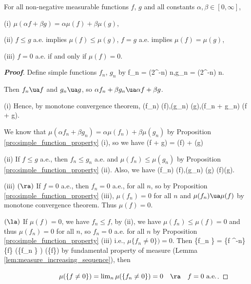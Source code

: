\begin{theorem}\label{thm:non_negative_measurable_property}
For all non-negative measurable functions $f$, $g$ and all constants $\alpha, \beta \in [0,\infty]$,
\ben
\item [(i)] $\mu(\alpha f + \beta g) = \alpha\mu(f) + \beta\mu(g)$,
\item [(ii)] $f \leq g$ a.e. implies $\mu(f) \leq \mu(g)$, $f=g$ a.e. implies $\mu(f) = \mu(g)$,
\item [(iii)] $f = 0$ a.e. if and only if $\mu(f) = 0$.
\een
\end{theorem}
\begin{proof}[\bf Proof]
Define simple functions $f_n$, $g_n$ by
\be
f_n = (2^{-n}) \land n,\quad\quad  g_n = (2^{-n}) \land n.
\ee

Then $f_n \ua f$ and $g_n \ua g$, so $\alpha f_n+\beta g_n \ua \alpha f +\beta g$.
\ben
\item [(i)] Hence, by monotone convergence theorem,
\be
\mu(f_n) \ua \mu(f),\quad \mu(g_n) \ua \mu(g),\quad \mu(\alpha f_n + \beta g_n) \ua \mu(\alpha f + \beta g).
\ee

We know that $\mu(\alpha f_n + \beta g_n) = \alpha\mu(f_n) + \beta\mu(g_n)$ by Proposition \ref{pro:simple_function_property} (i), so we have
\be
\mu(\alpha f + \beta g) = \alpha\mu(f) + \beta\mu(g)
\ee
\item [(ii)] If $f\leq g$ a.e., then $f_n \leq g_n$ a.e. and $\mu(f_n) \leq \mu(g_n)$ by Proposition \ref{pro:simple_function_property} (ii). Also, we have
\be
\mu(f_n) \ua \mu(f),\quad \mu(g_n) \ua \mu(g) \quad\ra\quad \mu(f)\leq \mu(g).
\ee

\item [(iii)] $(\ra)$ If $f = 0$ a.e., then $f_n = 0$ a.e., for all $n$, so by Proposition \ref{pro:simple_function_property} (iii), $\mu(f_n) = 0$ for all $n$ and $\mu(f_n)\ua \mu(f)$ by monotone convergence theorem. Thus $\mu(f) = 0$.

$(\la)$ If $\mu(f) = 0$, we have $f_n \leq f$, by (ii), we have $\mu(f_n) \leq \mu(f) = 0$ and thus $\mu(f_n) = 0$ for all $n$, so $f_n = 0$ a.e. for all $n$ by Proposition \ref{pro:simple_function_property} (iii) i.e., $\mu\{f_n \neq 0\}) = 0$. Then
\be
\{f_n \} = \{f ^{-n}\} \ua \{f\} \quad \ra \quad \mu(\{f_n \} ) \ua \mu(\{f\})
\ee
by fundamental property of measure (Lemma \ref{lem:measure_increasing_sequence}), then
\een

$\qquad\qquad\qquad\qquad \mu(\{f\neq 0\}) = \lim_n\mu(\{f_n \neq 0\} ) = 0 \quad \ra \quad f = 0 \text{ a.e.}$.
\end{proof}

